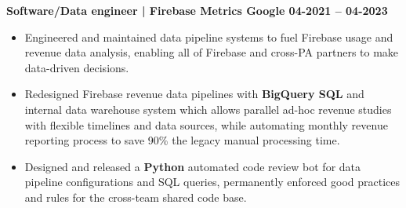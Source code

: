 \textbf{Software/Data engineer | Firebase Metrics \hspace{-10mm} \hfill Google \hfill 04-2021 -- 04-2023}\par

\begin{itemize}
        \item Engineered and maintained data pipeline systems to fuel Firebase usage and revenue data analysis, enabling all of Firebase and cross-PA partners to make data-driven decisions.
        \item Redesigned Firebase revenue data pipelines with \textbf{BigQuery SQL} and internal data warehouse system which allows parallel ad-hoc revenue studies with flexible timelines and data sources, while automating monthly revenue reporting process to save {90{\%}} the legacy manual processing time.
	\item Designed and released a \textbf{Python} automated code review bot for data pipeline configurations and SQL queries, permanently enforced good practices and rules for the cross-team shared code base.
\end{itemize}\par
